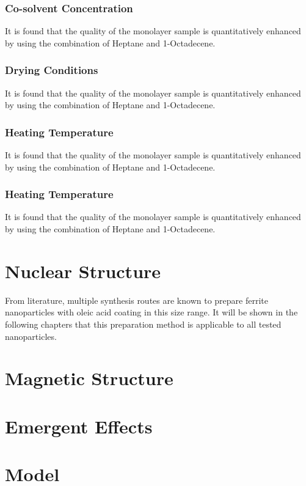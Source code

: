 \documentclass[\main/dresen_thesis.tex]{subfiles}
\begin{document}
      \subsubsection{Co-solvent Concentration}
        It is found that the quality of the monolayer sample is quantitatively enhanced by using the combination of Heptane and 1-Octadecene.

      \subsubsection{Drying Conditions}
        It is found that the quality of the monolayer sample is quantitatively enhanced by using the combination of Heptane and 1-Octadecene.

      \subsubsection{Heating Temperature}
        It is found that the quality of the monolayer sample is quantitatively enhanced by using the combination of Heptane and 1-Octadecene.

      \subsubsection{Heating Temperature}
          It is found that the quality of the monolayer sample is quantitatively enhanced by using the combination of Heptane and 1-Octadecene.
    \section{Nuclear Structure}
      From literature, multiple synthesis routes are known to prepare ferrite nanoparticles with oleic acid coating in this size range. It will be shown in the following chapters that this preparation method is applicable to all tested nanoparticles.

    \section{Magnetic Structure}

    \section{Emergent Effects}

    \section{Model}
\end{document}
